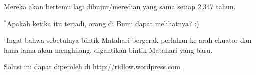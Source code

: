\documentclass[11pt,fleqn]{exam}
\begin{document}
\begin{questions}
Mereka akan bertemu lagi dibujur/meredian yang sama setiap 2,347 tahun. 

$^\ast$Apakah ketika itu terjadi, orang di Bumi dapat melihatnya? :)

$^\dagger$Ingat bahwa sebetulnya bintik Matahari bergerak perlahan ke arah ekuator dan lama-lama akan menghilang, digantikan bintik Matahari yang baru.


\end{questions}



\vspace{5cm}
\begin{flushright}
Solusi ini dapat diperoleh di \url{http://ridlow.wordpress.com}
\end{flushright}
\end{document}
